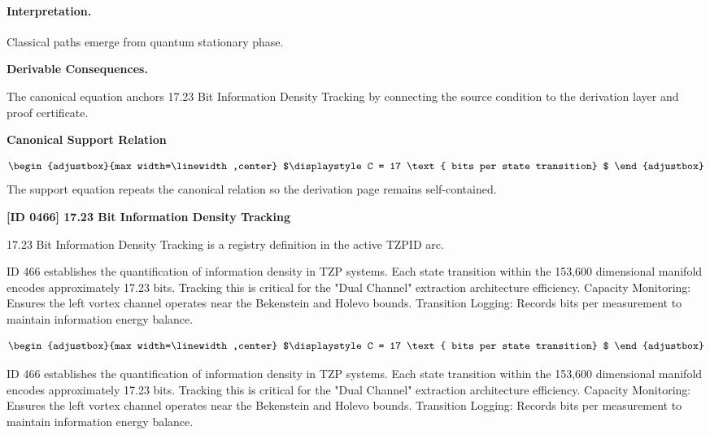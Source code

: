 \paragraph{Interpretation.}
Classical paths emerge from quantum stationary phase.

\par\vspace{0.35em}
\noindent\textbf{Derivable Consequences.}\quad
\begingroup
\footnotesize
\raggedright
The canonical equation anchors 17.23 Bit Information Density Tracking by connecting the source condition to the derivation layer and proof certificate.
\par\endgroup

\noindent\textbf{Canonical Support Relation}\par
\[
\begin{adjustbox}{max width=\linewidth,center}
$\displaystyle
C = 17 \text{ bits per state transition}
$
\end{adjustbox}
\]
\noindent The support equation repeats the canonical relation so the derivation page remains self-contained.\par

\clearpage
\noindent\textbf{[ID 0466] 17.23 Bit Information Density Tracking}\par
\vspace{0.35em}
\begingroup\small
{}
17.23 Bit Information Density Tracking is a registry definition in the active TZPID arc.

ID 466 establishes the quantification of information density in TZP systems. Each state transition within the 153,600 dimensional manifold encodes approximately 17.23 bits. Tracking this is critical for the "Dual Channel" extraction architecture efficiency. Capacity Monitoring: Ensures the left vortex channel operates near the Bekenstein and Holevo bounds. Transition Logging: Records bits per measurement to maintain information energy balance.

\[
\begin{adjustbox}{max width=\linewidth,center}
$\displaystyle
C = 17 \text{ bits per state transition}
$
\end{adjustbox}
\]

ID 466 establishes the quantification of information density in TZP systems. Each state transition within the 153,600 dimensional manifold encodes approximately 17.23 bits. Tracking this is critical for the "Dual Channel" extraction architecture efficiency. Capacity Monitoring: Ensures the left vortex channel operates near the Bekenstein and Holevo bounds. Transition Logging: Records bits per measurement to maintain information energy balance.

